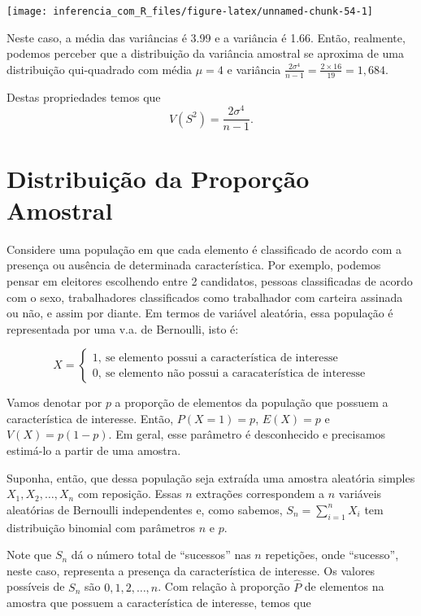 \documentclass[
]{book}
\begin{document}
\begin{center}\texttt{[image: inferencia\_com\_R\_files/figure-latex/unnamed-chunk-54-1]} \end{center}

Neste caso, a média das variâncias é 3.99 e a variância é 1.66. Então, realmente, podemos perceber que a distribuição da variância amostral se aproxima de uma distribuição qui-quadrado com média \(\mu=4\) e variância \(\frac{2\sigma^4}{n-1}=\frac{2\times 16}{19}=1,684\).

Destas propriedades temos que \[V(S^2)=\frac{2\sigma^4}{n-1}.\]

\hypertarget{distribuiuxe7uxe3o-da-proporuxe7uxe3o-amostral}{%
\section{Distribuição da Proporção Amostral}\label{distribuiuxe7uxe3o-da-proporuxe7uxe3o-amostral}}

Considere uma população em que cada elemento é classificado de acordo com a presença ou ausência de determinada característica. Por exemplo, podemos pensar em eleitores escolhendo entre 2 candidatos, pessoas classificadas de acordo com o sexo, trabalhadores classificados como trabalhador com carteira assinada ou não, e assim por diante. Em termos de variável aleatória, essa população é representada por uma v.a. de Bernoulli, isto é:

\[
X=\begin{cases}
1,~\text{se elemento possui a característica de interesse}\\
0,~\text{se elemento não possui a caracaterística de interesse}
\end{cases}
\]

Vamos denotar por \(p\) a proporção de elementos da população que possuem a característica de interesse. Então, \(P(X = 1) = p\), \(E(X) = p\) e \(V(X) = p(1 -p)\). Em geral, esse parâmetro é desconhecido e precisamos estimá-lo a partir de uma amostra.

Suponha, então, que dessa população seja extraída uma amostra aleatória simples \(X_1, X_2, \ldots , X_n\) com reposição. Essas \(n\) extrações correspondem a \(n\) variáveis aleatórias de Bernoulli independentes e, como sabemos, \(S_n =\sum_{i=1}^n X_i\) tem distribuição binomial com parâmetros \(n\) e \(p\).

Note que \(S_n\) dá o número total de ``sucessos'' nas \(n\) repetições, onde ``sucesso'', neste caso, representa a presença da característica de interesse. Os valores possíveis de \(S_n\) são \(0, 1, 2,\ldots , n\). Com relação à proporção \(\hat P\) de elementos na amostra que possuem a característica de interesse, temos que
\end{document}
